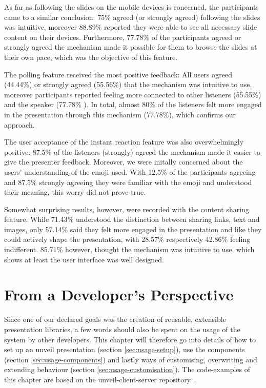 As far as following the slides on the mobile devices is concerned, the participants came to a similar conclusion: 75\% agreed (or strongly agreed) following the slides was intuitive, moreover 88.89\% reported they were able to see all necessary slide content on their devices. Furthermore, 77.78\% of the participants agreed or strongly agreed the mechanism made it possible for them to browse the slides at their own pace, which was the objective of this feature.

The polling feature received the most positive feedback: All users agreed (44.44\%) or strongly agreed (55.56\%) that the mechanism was intuitive to use, moreover participants reported feeling more connected to other listeners (55.55\%) and the speaker (77.78\% ). In total, almost 80\% of the listeners felt more engaged in the presentation through this mechanism (77.78\%), which confirms our approach.

The user acceptance of the instant reaction feature was also overwhelmingly positive: 87.5\% of the listeners (strongly) agreed the mechanism made it easier to give the presenter feedback. Moreover, we were initally concerned about the users' understanding of the emoji used. With 12.5\% of the participants agreeing and 87.5\% strongly agreeing they were familiar with the emoji and understood their meaning, this worry did not prove true.

Somewhat surprising results, however, were recorded with the content sharing feature. While 71.43\% understood the distinction between sharing links, text and images, only 57.14\% said they felt more engaged in the presentation and like they could actively shape the presentation, with 28.57\% respectively 42.86\% feeling indifferent. 85.71\% however, thought the mechanism was intuitive to use, which shows at least the user interface was well designed.

\section{From a Developer's Perspective}
\label{sec:results-developer}

Since one of our declared goals was the creation of reusable, extensible presentation libraries, a few words should also be spent on the usage of the system by other developers. This chapter will therefore go into details of how to set up an unveil presentation (section \ref{sec:usage-setup}), use the components (section \ref{sec:usage-components}) and lastly ways of customising, overwriting and extending behaviour (section \ref{sec:usage-customisation}). The code-examples of this chapter are based on the unveil-client-server repository \cite{unveil-client-server}.

